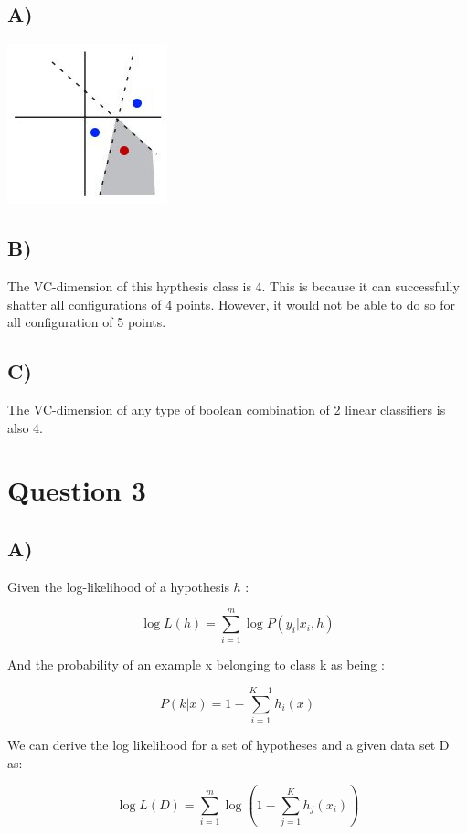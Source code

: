 \documentclass{report}
\begin{document}
\subsection*{A)}
\includegraphics[width=175px, keepaspectratio]{3points.jpg}
\subsection*{B)}
The VC-dimension of this hypthesis class is 4. This is because it can successfully
shatter all configurations of 4 points. However, it would not be able to do so for all
configuration of 5 points.
\subsection*{C)}
The VC-dimension of any type of boolean combination of 2 linear classifiers is
also 4.

\section*{Question 3}
\subsection*{A)}
Given the log-likelihood of a hypothesis $h$ :

\begin{equation}
  \log L(h) = \sum_{i=1}^{m} \log P(y_i|x_i,h)
\end{equation}

And the probability of an example x belonging to class k as being :

\begin{equation}
  P(k | x) = 1 - \sum_{i=1}^{K-1}h_i(x)
\end{equation}

We can derive the log likelihood for a set of hypotheses and a given data set D as:

\begin{equation}
  \log L(D) = \sum_{i=1}^{m} \log
  \left( 1 -
  \sum_{j=1}^{K} h_j(x_i)
  \right)
\end{equation}
\end{document}
